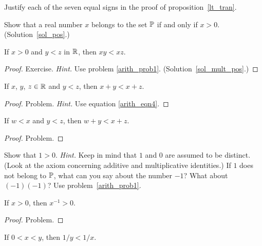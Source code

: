 \begin{prob} Justify each of the seven equal signs in the proof of proposition~\ref{lt_tran}.
\end{prob}

\begin{exer}\label{pos} Show that a real number $x$ belongs to the set $\mathbb{P}$ if and only if
$x > 0$.  (Solution~\ref{sol_pos}.)

\end{exer}

\begin{prop}\label{mult_pos} If $x > 0$ and $y < z$ in $\mathbb{R}$, then $xy < xz$.
\end{prop}

\begin{proof} Exercise.  \emph{Hint.} Use problem \ref{arith_prob1}.
(Solution~\ref{sol_mult_pos}.)  \ns
\end{proof}

\begin{prop} If $x$, $y$, $z \in \mathbb{R}$ and $y < z$, then $x + y < x + z$.
\end{prop}

\begin{proof} Problem.  \emph{Hint.}  Use equation \eqref{arith_eqn4}. \ns
\end{proof}

\begin{prop} If $w < x$ and $y < z$, then $w + y < x + z$.
\end{prop}

\begin{proof} Problem. \ns  \end{proof}

\begin{prob}  Show that $1 > 0$. \emph{Hint.} Keep in mind that $1$ and $0$ are assumed to be
distinct. (Look at the axiom concerning additive and multiplicative identities.)  If $1$ does
not belong to $\mathbb{P}$, what can you say about the number $-1$? What about $(-1)(-1)$? Use
problem~\ref{arith_prob1}.
\end{prob}

\begin{prop} If $x > 0$, then $x^{-1} > 0$.
\end{prop}

\begin{proof} Problem.  \ns  \end{proof}

\begin{prop}  If $0 < x < y$, then $1/y < 1/x$.
\end{prop}

